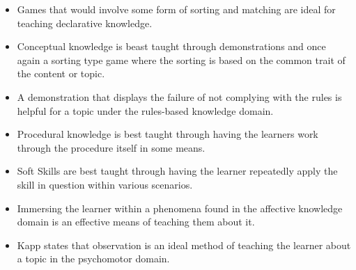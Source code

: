\documentclass[conference]{IEEEtran}
\begin{document}
\begin{itemize}
\item
Games that would involve some form of sorting and matching are ideal for teaching declarative knowledge.
\item
Conceptual knowledge is beast taught through demonstrations and once again a sorting type game where the sorting is based on the common trait of the content or topic.
\item
A demonstration that displays the failure of not complying with the rules is helpful for a topic under the rules-based knowledge domain.
\item
Procedural knowledge is best taught through having the learners work through the procedure itself in some means.
\item
Soft Skills are best taught through having the learner repeatedly apply the skill in question within various scenarios.
\item
Immersing the learner within a phenomena found in the affective knowledge domain is an effective means of teaching them about it.
\item
Kapp\cite{Kapp2012a} states that observation is an ideal method of teaching the learner about a topic in the psychomotor domain.
\end{itemize}
\end{document}
